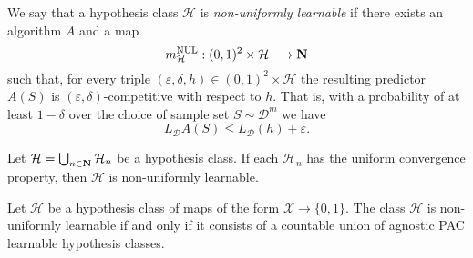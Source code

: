 \begin{definition}
    \label{def:non-uniform-learnable-hypothesis-class}
    We say that a hypothesis class \(\mathcal{H}\) is \emph{non-uniformly learnable} if there
    exists an algorithm \(A\) and a map
    \[
        m_{\mathcal{H}}^{\text{NUL}}: (0, 1)^2 \times \mathcal{H} \longrightarrow \mathbf{N}
    \]
    such that, for every triple \((\varepsilon, \delta, h) \in (0, 1)^2 \times \mathcal{H}\) the resulting predictor
    \(A(S)\) is \((\varepsilon, \delta)\)-competitive with respect to \(h\). That is, with a
    probability of at least \(1 - \delta\) over the choice of sample set \(S \sim \mathcal{D}^m\) we have
    \[
        L_{\mathcal{D}} A(S) \leq L_{\mathcal{D}}(h) + \varepsilon.
    \]
\end{definition}

\begin{lemma}
    \label{lem:countable-unif-conv-prop--then-non-unif-learnable}
    Let \(\mathcal{H} = \bigcup_{n \in \mathbf{N}} \mathcal{H}_n\) be a hypothesis class. If each \(\mathcal{H}_n\) has the
    uniform convergence property, then \(\mathcal{H}\) is non-uniformly learnable.
\end{lemma}

\begin{theorem}
    \label{thm:non-uniformly-learnable-iff-countable-union-pac}
    Let \(\mathcal{H}\) be a hypothesis class of maps of the form
    \(\mathcal{X} \to \{0, 1\}\). The class \(\mathcal{H}\) is non-uniformly learnable if and only if it
    consists of a countable union of agnostic PAC learnable hypothesis classes.
\end{theorem}



